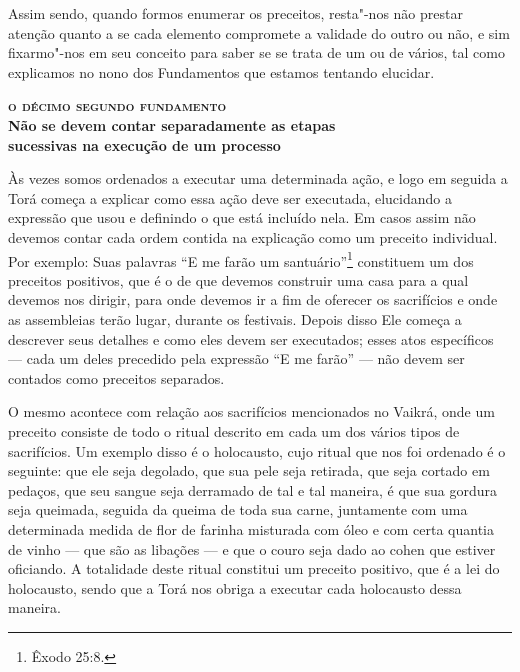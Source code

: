 Assim sendo, quando formos enumerar os preceitos, resta"-nos não prestar
atenção quanto a se cada elemento compromete a validade do outro ou não,
e sim fixarmo"-nos em seu conceito para saber se se trata de um ou de
vários, tal como explicamos no nono dos Fundamentos que estamos tentando
elucidar.




\bigskip

\noindent\textbf{\textsc{o décimo segundo fundamento}\\Não se devem contar separadamente as etapas\\ sucessivas na execução de um processo}

\smallskip

Às vezes somos ordenados a executar uma determinada ação, e logo em
seguida a Torá\starr{} começa a explicar como essa ação deve ser executada,
elucidando a expressão que usou e definindo o que está incluído nela. Em
casos assim não devemos contar cada ordem contida na explicação como um
preceito individual. Por exemplo: Suas palavras ``E me farão um
santuário''\footnote{Êxodo 25:8.} constituem um dos preceitos positivos, que é o
de que devemos construir uma casa para a qual devemos nos dirigir, para
onde devemos ir a fim de oferecer os sacrifícios e onde as assembleias
terão lugar, durante os festivais. Depois disso Ele começa a descrever
seus detalhes e como eles devem ser executados; esses atos específicos
--- cada um deles precedido pela expressão ``E me farão'' --- não devem
ser contados como preceitos separados.

O mesmo acontece com relação aos sacrifícios mencionados no
Vaikrá\starr, onde um preceito consiste de todo o ritual descrito em
cada um dos vários tipos de sacrifícios. Um exemplo disso é o
holocausto, cujo ritual que nos foi ordenado é o seguinte: que ele seja
degolado, que sua pele seja retirada, que seja cortado em pedaços, que
seu sangue seja derramado de tal e tal maneira, é que sua gordura seja
queimada, seguida da queima de toda sua carne, juntamente com uma
determinada medida de flor de farinha misturada com óleo e com certa
quantia de vinho --- que são as libações --- e que o couro seja dado ao
cohen\starr{} que estiver oficiando. A totalidade deste ritual constitui um
preceito positivo, que é a lei do holocausto, sendo que a Torá\starr{} nos
obriga a executar cada holocausto dessa maneira.

